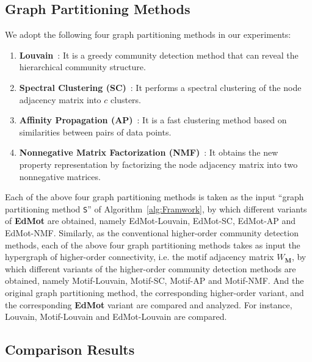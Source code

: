 \documentclass[sigconf]{acmart}
\begin{document}
\subsection{Graph Partitioning Methods}
\label{sec:clusteringmethod}
We adopt the following four graph partitioning methods in our experiments:
\begin{enumerate}[1)]
\item
\textbf{Louvain}~\cite{Vincent2008Fast}: It is a greedy community detection method that can reveal the hierarchical community structure.
\item
\textbf{Spectral Clustering (SC)}~\cite{ng2002spectral}: It performs a spectral clustering of the node adjacency matrix into $c$ clusters.
\item
\textbf{Affinity Propagation (AP)}~\cite{frey2007clustering}: It is a fast clustering method based on similarities between pairs of data points.
\item
\textbf{Nonnegative Matrix Factorization (NMF)}~\cite{cai2011graph}: It obtains the new property representation by factorizing the node adjacency matrix into two nonnegative matrices.
\end{enumerate}
Each of the above four graph partitioning methods is taken as the input ``graph partitioning method \texttt{S}'' of Algorithm~\ref{alg:Framwork}, by which different variants of \textbf{EdMot} are obtained, namely EdMot-Louvain, EdMot-SC, EdMot-AP and EdMot-NMF. Similarly, as the conventional higher-order community detection methods, each of the above four graph partitioning methods takes as input the hypergraph of higher-order connectivity, i.e. the motif adjacency matrix $W_{\mathbf{M}}$, by which different variants of the higher-order community detection methods are obtained, namely Motif-Louvain, Motif-SC, Motif-AP and Motif-NMF. And the original graph partitioning method, the corresponding higher-order variant, and the corresponding \textbf{EdMot} variant are compared and analyzed. For instance, Louvain, Motif-Louvain and EdMot-Louvain are compared.

\subsection{Comparison Results}
\label{sec:results}
\end{document}
